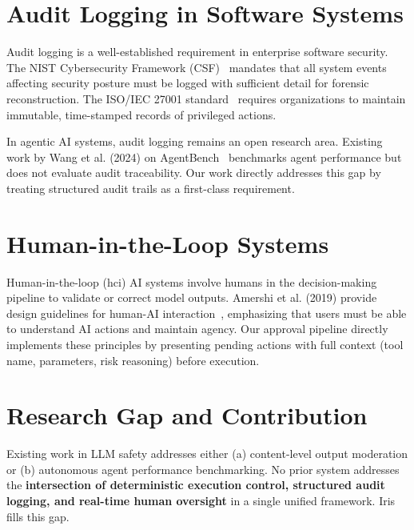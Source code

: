 \section{Audit Logging in Software Systems}

Audit logging is a well-established requirement in enterprise software security. The NIST Cybersecurity Framework (CSF)~\cite{nist2018csf} mandates that all system events affecting security posture must be logged with sufficient detail for forensic reconstruction. The ISO/IEC 27001 standard~\cite{iso27001} requires organizations to maintain immutable, time-stamped records of privileged actions.

In agentic AI systems, audit logging remains an open research area. Existing work by Wang et al. (2024) on AgentBench~\cite{liu2023agentbench} benchmarks agent performance but does not evaluate audit traceability. Our work directly addresses this gap by treating structured audit trails as a first-class requirement.

\section{Human-in-the-Loop Systems}

Human-in-the-loop (\gls{hci}) AI systems involve humans in the decision-making pipeline to validate or correct model outputs. Amershi et al. (2019) provide design guidelines for human-AI interaction~\cite{amershi2019guidelines}, emphasizing that users must be able to understand AI actions and maintain agency. Our approval pipeline directly implements these principles by presenting pending actions with full context (tool name, parameters, risk reasoning) before execution.

\section{Research Gap and Contribution}

Existing work in LLM safety addresses either (a) content-level output moderation or (b) autonomous agent performance benchmarking. No prior system addresses the \textbf{intersection of deterministic execution control, structured audit logging, and real-time human oversight} in a single unified framework. Iris fills this gap.

